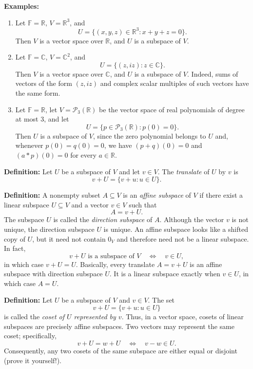 \documentclass[a4paper,11pt,abstract=true]{scrartcl}
\theoremstyle{dotlessP}
\theoremstyle{dotlessS}
\theoremstyle{remark}
\theoremstyle{definition}
\begin{document}
\textbf{Examples:}
\begin{enumerate}
    \item Let $\mathbb{F}=\mathbb{R}$, $V=\mathbb{R}^3$, and
    \[
    U=\{(x,y,z)\in\mathbb{R}^3:x+y+z=0\}.
    \]
    Then $V$ is a vector space over $\mathbb{R}$, and $U$ is a subspace of
    $V$.

    \item Let $\mathbb{F}=\mathbb{C}$, $V=\mathbb{C}^2$, and
    \[
    U=\{(z,iz):z\in\mathbb{C}\}.
    \]
    Then $V$ is a vector space over $\mathbb{C}$, and $U$ is a subspace of
    $V$. Indeed, sums of vectors of the form $(z,iz)$ and complex scalar
    multiples of such vectors have the same form.

    \item Let $\mathbb{F}=\mathbb{R}$, let $V=\mathcal{P}_3(\mathbb{R})$ be the vector
    space of real polynomials of degree at most $3$, and let
    \[
    U=\{p\in\mathcal{P}_3(\mathbb{R}):p(0)=0\}.
    \]
    Then $U$ is a subspace of $V$, since the zero polynomial belongs to $U$
    and, whenever $p(0)=q(0)=0$, we have
    $(p+q)(0)=0$ and $(a*p)(0)=0$ for every $a\in\mathbb{R}$.
\end{enumerate}

\begin{definition_box}
\textbf{Definition:} Let $U$ be a subspace of $V$
and let $v\in V$. The \emph{translate} of $U$ by $v$ is
\[
v+U=\{v+u:u\in U\}.
\]
\end{definition_box}

\textbf{Definition:} A nonempty subset $A\subseteq V$ is an
\emph{affine subspace} of $V$ if there exist a linear subspace $U\subseteq V$
and a vector $v\in V$ such that
\[
A=v+U.
\]
The subspace $U$ is called the \emph{direction subspace} of $A$. Although the
vector $v$ is not unique, the direction subspace $U$ is unique. An affine
subspace looks like a shifted copy of $U$, but it need not contain $0_V$ and
therefore need not be a linear subspace. In fact,
\[
v+U\text{ is a subspace of }V
\quad\Longleftrightarrow\quad
v\in U,
\]
in which case $v+U=U$. Basically, 
every translate $A=v+U$ is an affine subspace with direction subspace $U$.  It is a linear
subspace exactly when $v\in U$, in which case $A=U$.

\textbf{Definition:} Let $U$ be a subspace of $V$ and $v\in V$. The
set
\[
v+U=\{v+u:u\in U\}
\]
is called the \emph{coset of $U$ represented by $v$}. Thus, in a vector
space, cosets of linear subspaces are precisely affine subspaces. Two vectors
may represent the same coset; specifically,
\[
v+U=w+U
\quad\Longleftrightarrow\quad
v-w\in U.
\]
Consequently, any two cosets of the same subspace are either equal or
disjoint (prove it yourself!).
\end{document}
